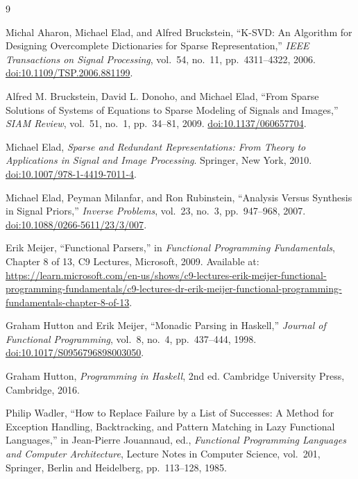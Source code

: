 \documentclass[11pt]{article}
\begin{document}
\begin{thebibliography}{9}

Michal Aharon, Michael Elad, and Alfred Bruckstein,
``K-SVD: An Algorithm for Designing Overcomplete Dictionaries for
Sparse Representation,''
\emph{IEEE Transactions on Signal Processing},
vol.~54, no.~11, pp.~4311--4322, 2006.
\href{https://doi.org/10.1109/TSP.2006.881199}
{doi:10.1109/TSP.2006.881199}.

Alfred M. Bruckstein, David L. Donoho, and Michael Elad,
``From Sparse Solutions of Systems of Equations to Sparse Modeling of
Signals and Images,''
\emph{SIAM Review},
vol.~51, no.~1, pp.~34--81, 2009.
\href{https://doi.org/10.1137/060657704}
{doi:10.1137/060657704}.

Michael Elad,
\emph{Sparse and Redundant Representations:
From Theory to Applications in Signal and Image Processing}.
Springer, New York, 2010.
\href{https://doi.org/10.1007/978-1-4419-7011-4}
{doi:10.1007/978-1-4419-7011-4}.

Michael Elad, Peyman Milanfar, and Ron Rubinstein,
``Analysis Versus Synthesis in Signal Priors,''
\emph{Inverse Problems},
vol.~23, no.~3, pp.~947--968, 2007.
\href{https://doi.org/10.1088/0266-5611/23/3/007}
{doi:10.1088/0266-5611/23/3/007}.

Erik Meijer,
``Functional Parsers,''
in \emph{Functional Programming Fundamentals}, Chapter 8 of 13,
C9 Lectures, Microsoft, 2009.
Available at:
\url{https://learn.microsoft.com/en-us/shows/c9-lectures-erik-meijer-functional-programming-fundamentals/c9-lectures-dr-erik-meijer-functional-programming-fundamentals-chapter-8-of-13}.

Graham Hutton and Erik Meijer,
``Monadic Parsing in Haskell,''
\emph{Journal of Functional Programming},
vol.~8, no.~4, pp.~437--444, 1998.
\href{https://doi.org/10.1017/S0956796898003050}
{doi:10.1017/S0956796898003050}.

Graham Hutton,
\emph{Programming in Haskell},
2nd ed.
Cambridge University Press, Cambridge, 2016.

Philip Wadler,
``How to Replace Failure by a List of Successes:
A Method for Exception Handling, Backtracking, and Pattern Matching
in Lazy Functional Languages,''
in Jean-Pierre Jouannaud, ed.,
\emph{Functional Programming Languages and Computer Architecture},
Lecture Notes in Computer Science, vol.~201,
Springer, Berlin and Heidelberg,
pp.~113--128, 1985.


\end{thebibliography}
\end{document}
